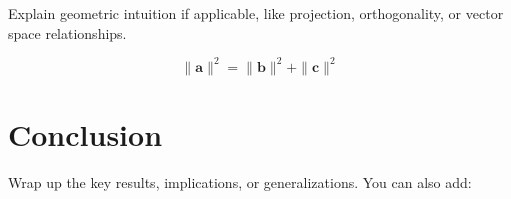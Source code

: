 \documentclass[12pt]{article}
\begin{document}
Explain geometric intuition if applicable, like projection, orthogonality, or vector space relationships.

\[
\| \mathbf{a} \|^2 = \| \mathbf{b} \|^2 + \| \mathbf{c} \|^2
\]

\section{Conclusion}

Wrap up the key results, implications, or generalizations. You can also add:

\begin{center}
\begin{framed}
\centering
{}
\end{framed}
\end{center}
\end{document}
